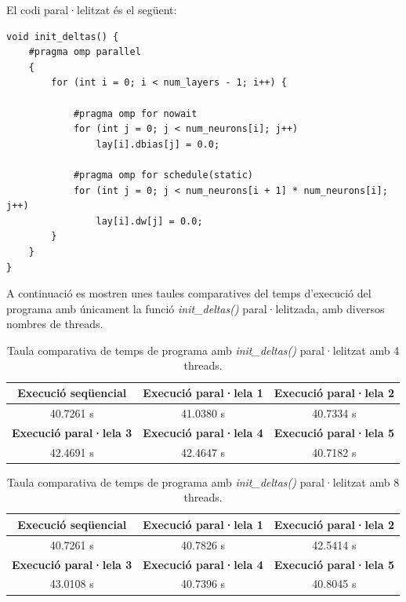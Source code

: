 \documentclass{article}
\begin{document}
El codi paral·lelitzat és el següent:

\begin{lstlisting}
void init_deltas() {
    #pragma omp parallel
    {
        for (int i = 0; i < num_layers - 1; i++) {

            #pragma omp for nowait
            for (int j = 0; j < num_neurons[i]; j++)
                lay[i].dbias[j] = 0.0;

            #pragma omp for schedule(static)
            for (int j = 0; j < num_neurons[i + 1] * num_neurons[i]; j++)
                lay[i].dw[j] = 0.0;
        }
    }
}
\end{lstlisting}

A continuació es mostren unes taules comparatives del temps d'execució del programa amb únicament la funció \textit{init\_deltas()} paral·lelitzada, amb diversos nombres de threads.

\begin{table}[H]
    \centering
    \begin{tabular}{|c|c|c|}
        \hline
        \textbf{Execució seqüencial} & \textbf{Execució paral·lela 1} & \textbf{Execució paral·lela 2} \\ \hline
        40.7261 s & 41.0380 s & 40.7334 s \\ \hline
        \textbf{Execució paral·lela 3} & \textbf{Execució paral·lela 4} & \textbf{Execució paral·lela 5} \\ \hline
        42.4691 s & 42.4647 s & 40.7182 s \\ \hline
    \end{tabular}
    \caption{Taula comparativa de temps de programa amb \textit{init\_deltas()} paral·lelitzat amb 4 threads.}
    \label{tab:f2_4trheads}
\end{table}

\begin{table}[H]
    \centering
    \begin{tabular}{|c|c|c|}
        \hline
        \textbf{Execució seqüencial} & \textbf{Execució paral·lela 1} & \textbf{Execució paral·lela 2} \\ \hline
        40.7261 s & 40.7826 s & 42.5414 s \\ \hline
        \textbf{Execució paral·lela 3} & \textbf{Execució paral·lela 4} & \textbf{Execució paral·lela 5} \\ \hline
        43.0108 s & 40.7396 s & 40.8045 s \\ \hline
    \end{tabular}
    \caption{Taula comparativa de temps de programa amb \textit{init\_deltas()} paral·lelitzat amb 8 threads.}
    \label{tab:f2_8trheads}
\end{table}
\end{document}
